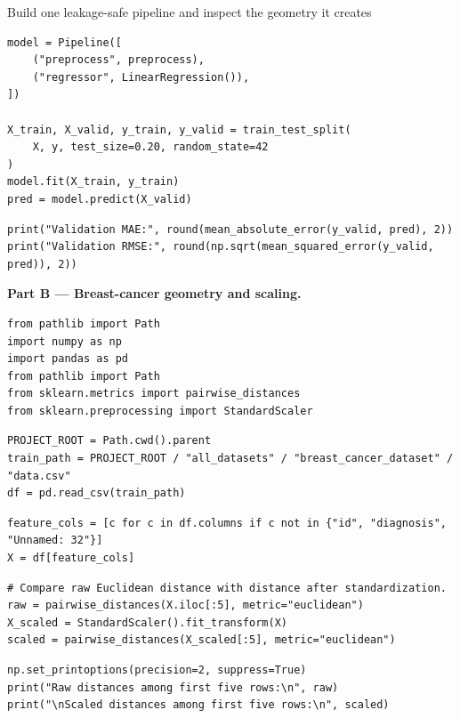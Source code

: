 \begin{labproject}{Build one leakage-safe pipeline and inspect the geometry it creates}
\begin{lstlisting}[style=mlpython]
model = Pipeline([
    ("preprocess", preprocess),
    ("regressor", LinearRegression()),
])

X_train, X_valid, y_train, y_valid = train_test_split(
    X, y, test_size=0.20, random_state=42
)
model.fit(X_train, y_train)
pred = model.predict(X_valid)
\end{lstlisting}

\begin{lstlisting}[style=mlpython]
print("Validation MAE:", round(mean_absolute_error(y_valid, pred), 2))
print("Validation RMSE:", round(np.sqrt(mean_squared_error(y_valid, pred)), 2))
\end{lstlisting}

\medskip\noindent\textbf{Part B --- Breast-cancer geometry and scaling.}\par
\begin{lstlisting}[style=mlpython]
from pathlib import Path
import numpy as np
import pandas as pd
from pathlib import Path
from sklearn.metrics import pairwise_distances
from sklearn.preprocessing import StandardScaler
\end{lstlisting}

\begin{lstlisting}[style=mlpython]
PROJECT_ROOT = Path.cwd().parent
train_path = PROJECT_ROOT / "all_datasets" / "breast_cancer_dataset" / "data.csv"
df = pd.read_csv(train_path)
\end{lstlisting}

\begin{lstlisting}[style=mlpython]
feature_cols = [c for c in df.columns if c not in {"id", "diagnosis", "Unnamed: 32"}]
X = df[feature_cols]
\end{lstlisting}

\begin{lstlisting}[style=mlpython]
# Compare raw Euclidean distance with distance after standardization.
raw = pairwise_distances(X.iloc[:5], metric="euclidean")
X_scaled = StandardScaler().fit_transform(X)
scaled = pairwise_distances(X_scaled[:5], metric="euclidean")
\end{lstlisting}

\begin{lstlisting}[style=mlpython]
np.set_printoptions(precision=2, suppress=True)
print("Raw distances among first five rows:\n", raw)
print("\nScaled distances among first five rows:\n", scaled)
\end{lstlisting}


\end{labproject}
